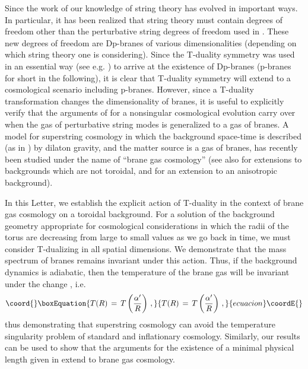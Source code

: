 \documentclass[a4paper,twocolumn,nofootinbib,tightenlines,prd,aps,
               superscriptaddress]{revtex4} %
\providecommand{\al}{\alpha}
\begin{document}
Since the work of \cite{Brandenberger:1989aj} our knowledge of
string theory has evolved in important ways. In particular, it has
been realized \cite{Polchinski:1995mt} that string theory must
contain degrees of freedom other than the perturbative string
degrees of freedom used in \cite{Brandenberger:1989aj}. These new
degrees of freedom are Dp-branes of various dimensionalities
(depending on which string theory one is considering). Since the
T-duality symmetry was used in an essential way (see e.g.
\cite{Polchinski:1998rr}) to arrive at the existence of Dp-branes
(p-branes for short in the following), it is clear that T-duality
symmetry will extend to a cosmological scenario including
p-branes. However, since a T-duality transformation changes the
dimensionality of branes, it is useful to explicitly verify that
the arguments of \cite{Brandenberger:1989aj} for a nonsingular
cosmological evolution carry over when the gas of perturbative
string modes is generalized to a gas of branes. A model for
superstring cosmology in which the background space-time is
described (as in \cite{Tseytlin:1992xk,Veneziano:1991ek}) by
dilaton gravity, and the matter source is a gas of branes, has
recently been studied under the name of ``brane gas cosmology''
\cite{Alexander:2000xv,Brandenberger:2001kj} (see also
\cite{Easson:2001fy,Easther:2002mi} for extensions to backgrounds
which are not toroidal, and \cite{Watson:2002nx} for an extension
to an anisotropic background).

In this Letter, we establish the explicit action of T-duality in
the context of brane gas cosmology on a toroidal background. For a
solution of the background geometry appropriate for cosmological
considerations in which the radii of the torus are decreasing from
large to small values as we go back in time, we must consider
T-dualizing in all spatial dimensions. We demonstrate that the
mass spectrum of branes remains invariant under this action. Thus,
if the background dynamics is adiabatic, then the temperature of
the brane gas will be invariant under the change \myHighlight{$R \rightarrow
{\al'/ R}$}\coordHE{}, i.e.
\begin{equation}\coord{}\boxEquation{
T(R) \, = \, T \left(\frac{\al'}{R}\right) \, ,
}{
T(R) \, = \, T \left(\frac{\al'}{R}\right) \, ,
}{ecuacion}\coordE{}\end{equation}
thus demonstrating that superstring cosmology can avoid the
temperature singularity problem of standard and inflationary
cosmology. Similarly, our results can be used to show that the
arguments for the existence of a minimal physical length given in
\cite{Brandenberger:1989aj} extend to brane gas cos\-mo\-logy.
\end{document}
